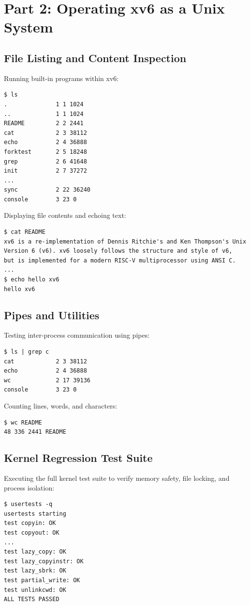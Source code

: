 \documentclass[12pt,a4paper]{article}
\begin{document}
\section{Part 2: Operating xv6 as a Unix System}

\subsection{File Listing and Content Inspection}
Running built-in programs within xv6:
\begin{lstlisting}[style=consolestyle]
$ ls
.              1 1 1024
..             1 1 1024
README         2 2 2441
cat            2 3 38112
echo           2 4 36888
forktest       2 5 18248
grep           2 6 41648
init           2 7 37272
...
sync           2 22 36240
console        3 23 0
\end{lstlisting}

Displaying file contents and echoing text:
\begin{lstlisting}[style=consolestyle]
$ cat README
xv6 is a re-implementation of Dennis Ritchie's and Ken Thompson's Unix
Version 6 (v6). xv6 loosely follows the structure and style of v6,
but is implemented for a modern RISC-V multiprocessor using ANSI C.
...
$ echo hello xv6
hello xv6
\end{lstlisting}

\subsection{Pipes and Utilities}
Testing inter-process communication using pipes:
\begin{lstlisting}[style=consolestyle]
$ ls | grep c
cat            2 3 38112
echo           2 4 36888
wc             2 17 39136
console        3 23 0
\end{lstlisting}

Counting lines, words, and characters:
\begin{lstlisting}[style=consolestyle]
$ wc README
48 336 2441 README
\end{lstlisting}

\subsection{Kernel Regression Test Suite}
Executing the full kernel test suite to verify memory safety, file locking, and process isolation:
\begin{lstlisting}[style=consolestyle]
$ usertests -q
usertests starting
test copyin: OK
test copyout: OK
...
test lazy_copy: OK
test lazy_copyinstr: OK
test lazy_sbrk: OK
test partial_write: OK
test unlinkcwd: OK
ALL TESTS PASSED
\end{lstlisting}
\end{document}
